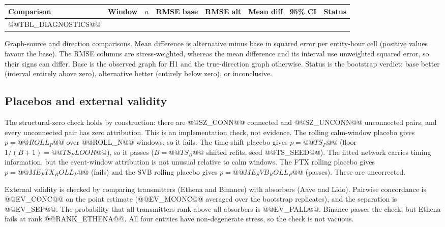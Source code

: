 \documentclass[referee,pdflatex,sn-mathphys-ay]{sn-jnl}
\newcommand{\fitbox}{\ifdim\wd\tabbox>\linewidth\resizebox{\linewidth}{!}{\usebox{\tabbox}}\else\usebox{\tabbox}\fi}%
\theoremstyle{thmstyleone}%
\theoremstyle{thmstyletwo}%
\theoremstyle{thmstylethree}%
\begin{document}
\begin{lrbox}{\tabbox}\footnotesize\setlength{\tabcolsep}{3pt}%
\begin{tabular}{@{}llcccccl@{}}
\toprule
\textbf{Comparison} & \textbf{Window} & \textbf{$n$} & \textbf{RMSE base} & \textbf{RMSE alt} & \textbf{Mean diff} & \textbf{95\% CI} & \textbf{Status}\\
\midrule
@@TBL_DIAGNOSTICS@@
\bottomrule
\end{tabular}
\end{lrbox}
\begin{tableorg}[tbp]
\centering
\caption{Graph-source and direction comparisons. Mean difference is alternative minus base in squared error per entity-hour
cell (positive values favour the base). The RMSE columns are stress-weighted, whereas the mean difference and its interval use unweighted squared error, so their signs can differ. Base is the observed graph for H1 and the true-direction graph otherwise. Status is
the bootstrap verdict: base better (interval entirely above zero), alternative better (entirely below zero), or inconclusive.}
\label{tab:diagnostics}
\fitbox
\end{tableorg}

\subsection{Placebos and external validity}
\label{subsec:placebo}
The structural-zero check holds by construction: there are
@@SZ_CONN@@ connected and @@SZ_UNCONN@@ unconnected pairs, and every unconnected pair has zero attribution. This is an
implementation check, not evidence. The rolling calm-window placebo gives $p=@@ROLL_P@@$ over @@ROLL_N@@ windows, so it fails.
The time-shift placebo gives $p=@@TS_P@@$ (floor $1/(B+1)=@@TS_FLOOR@@$), so it passes ($B=@@TS_B@@$ shifted refits, seed @@TS_SEED@@). The fitted network carries timing
information, but the event-window attribution is not unusual relative to calm windows. The FTX rolling placebo gives
$p=@@ME_FTX_ROLL_P@@$ (fails) and the SVB rolling placebo gives $p=@@ME_SVB_ROLL_P@@$ (passes). These are uncorrected.

External validity is checked by comparing transmitters (Ethena and Binance) with absorbers (Aave and Lido). Pairwise
concordance is @@EV_CONC@@ on the point estimate (@@EV_MCONC@@ averaged over the bootstrap replicates), and the separation is
@@EV_SEP@@. The probability that all transmitters rank above all absorbers is @@EV_PALL@@. Binance passes the check, but Ethena fails
at rank @@RANK_ETHENA@@. All four entities have non-degenerate stress, so the check is not vacuous.
\end{document}
